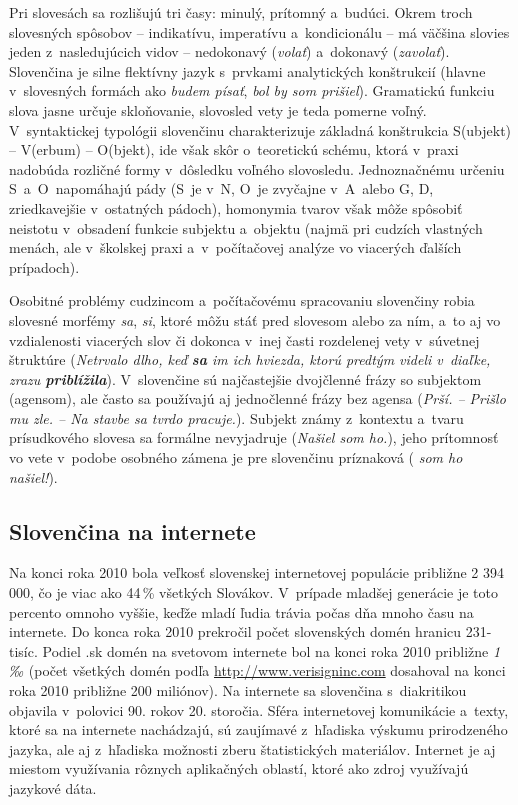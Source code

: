 \begin{multicols}{2}
Pri slovesách sa rozlišujú tri časy: minulý, prítomný a~budúci.
Okrem troch slovesných spôsobov – indikatívu, imperatívu
a~kondicionálu – má väčšina slovies jeden z~nasledujúcich vidov
– nedokonavý (\emph{volať}) a~dokonavý (\emph{zavolať}).
Slovenčina je silne flektívny jazyk s~prvkami analytických
konštrukcií (hlavne v~slovesných formách ako \emph{budem písať},
\emph{bol by som prišiel}). Gramatickú funkciu slova jasne určuje
skloňovanie, slovosled vety je teda pomerne voľný. V~syntaktickej
typológii slovenčinu charakterizuje základná konštrukcia S(ubjekt)
– V(erbum) – O(bjekt), ide však skôr o~teoretickú schému, ktorá
v~praxi nadobúda rozličné formy v~dôsledku voľného slovosledu.
Jednoznačnému určeniu S~a~O~napomáhajú pády (S~je v~N, O~je
zvyčajne v~A~alebo G, D, zriedkavejšie v~ostatných pádoch),
homonymia tvarov však môže spôsobiť neistotu v~obsadení funkcie
subjektu a~objektu (najmä pri cudzích vlastných menách, ale
v~školskej praxi a~v~počítačovej analýze vo viacerých ďalších
prípadoch). 

Osobitné problémy cudzincom a~počítačovému
spracovaniu slovenčiny robia slovesné morfémy
\emph{sa}, \emph{si}, ktoré môžu stáť pred slovesom alebo za ním,
a~to aj vo vzdialenosti viacerých slov či dokonca v~inej časti
rozdelenej vety v~súvetnej štruktúre (\emph{Netrvalo dlho, keď
\textbf{sa} im ich hviezda, ktorú predtým videli v~diaľke, zrazu 
\textbf{priblížila}}). V~slovenčine sú najčastejšie dvojčlenné
frázy so subjektom (agensom), ale často sa používajú aj
jednočlenné frázy bez agensa (\emph{Prší. – Prišlo mu zle. –
Na stavbe sa tvrdo pracuje.}). Subjekt známy z~kontextu a~tvaru
prísudkového slovesa sa formálne nevyjadruje (\emph{Našiel som
ho.}), jeho prítomnosť vo vete v~podobe osobného zámena je pre
slovenčinu príznaková (\emph{ som ho našiel!}).

\subsection{Slovenčina na internete}
Na konci roka 2010 bola veľkosť slovenskej internetovej
populácie približne 2 394 000, čo je viac ako 44\,\% všetkých
Slovákov. V~prípade mladšej generácie je toto percento omnoho
vyššie, keďže mladí ľudia trávia počas dňa mnoho času na
internete. Do konca roka 2010 prekročil počet slovenských domén
hranicu
231-tisíc\cite{f3}.
Podiel .sk domén na svetovom internete bol na konci roka 2010
približne \emph{1\,‰} (počet všetkých domén podľa \url{http://www.verisigninc.com} dosahoval na konci roka 2010 približne 200 miliónov). Na internete sa slovenčina s~diakritikou
objavila v~polovici 90. rokov 20. storočia. Sféra internetovej
komunikácie a~texty, ktoré sa na internete nachádzajú, sú
zaujímavé z~hľadiska výskumu prirodzeného jazyka, ale aj
z~hľadiska možnosti zberu štatistických materiálov. Internet je aj
miestom využívania rôznych aplikačných oblastí, ktoré ako zdroj
využívajú jazykové dáta. 


\end{multicols}
